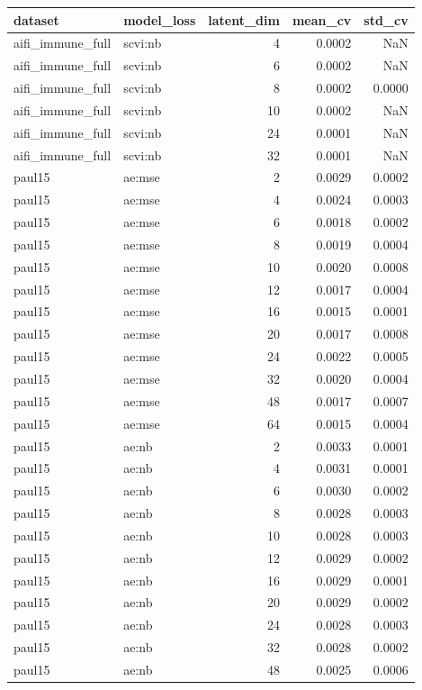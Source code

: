 \begin{tabular}{llrrr}
\toprule
dataset & model\_loss & latent\_dim & mean\_cv & std\_cv \\
\midrule
aifi\_immune\_full & scvi:nb & 4 & 0.0002 & NaN \\
aifi\_immune\_full & scvi:nb & 6 & 0.0002 & NaN \\
aifi\_immune\_full & scvi:nb & 8 & 0.0002 & 0.0000 \\
aifi\_immune\_full & scvi:nb & 10 & 0.0002 & NaN \\
aifi\_immune\_full & scvi:nb & 24 & 0.0001 & NaN \\
aifi\_immune\_full & scvi:nb & 32 & 0.0001 & NaN \\
paul15 & ae:mse & 2 & 0.0029 & 0.0002 \\
paul15 & ae:mse & 4 & 0.0024 & 0.0003 \\
paul15 & ae:mse & 6 & 0.0018 & 0.0002 \\
paul15 & ae:mse & 8 & 0.0019 & 0.0004 \\
paul15 & ae:mse & 10 & 0.0020 & 0.0008 \\
paul15 & ae:mse & 12 & 0.0017 & 0.0004 \\
paul15 & ae:mse & 16 & 0.0015 & 0.0001 \\
paul15 & ae:mse & 20 & 0.0017 & 0.0008 \\
paul15 & ae:mse & 24 & 0.0022 & 0.0005 \\
paul15 & ae:mse & 32 & 0.0020 & 0.0004 \\
paul15 & ae:mse & 48 & 0.0017 & 0.0007 \\
paul15 & ae:mse & 64 & 0.0015 & 0.0004 \\
paul15 & ae:nb & 2 & 0.0033 & 0.0001 \\
paul15 & ae:nb & 4 & 0.0031 & 0.0001 \\
paul15 & ae:nb & 6 & 0.0030 & 0.0002 \\
paul15 & ae:nb & 8 & 0.0028 & 0.0003 \\
paul15 & ae:nb & 10 & 0.0028 & 0.0003 \\
paul15 & ae:nb & 12 & 0.0029 & 0.0002 \\
paul15 & ae:nb & 16 & 0.0029 & 0.0001 \\
paul15 & ae:nb & 20 & 0.0029 & 0.0002 \\
paul15 & ae:nb & 24 & 0.0028 & 0.0003 \\
paul15 & ae:nb & 32 & 0.0028 & 0.0002 \\
paul15 & ae:nb & 48 & 0.0025 & 0.0006 \\

\end{tabular}

